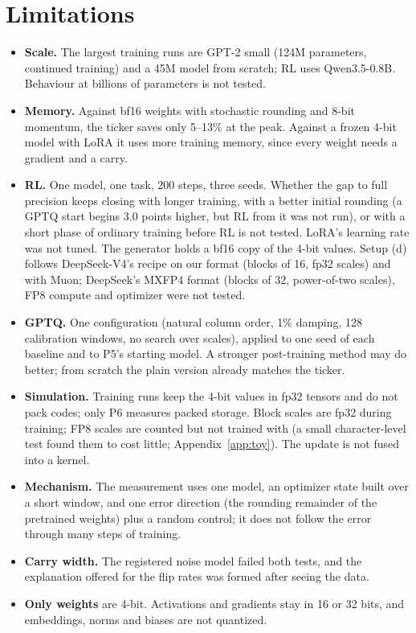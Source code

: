 \documentclass[11pt]{article}
\begin{document}
\section{Limitations}\label{sec:limitations}
\begin{itemize}
  \item \textbf{Scale.} The largest training runs are GPT-2 small (124M parameters, continued training) and a 45M
        model from scratch; RL uses Qwen3.5-0.8B. Behaviour at billions of parameters is not tested.
  \item \textbf{Memory.} Against bf16 weights with stochastic rounding and 8-bit momentum, the ticker saves only
        5--13\% at the peak. Against a frozen 4-bit model with LoRA it uses more training memory, since every weight
        needs a gradient and a carry.
  \item \textbf{RL.} One model, one task, 200 steps, three seeds. Whether the gap to full precision keeps closing with
        longer training, with a better initial rounding (a GPTQ start begins 3.0 points higher, but RL from it was not
run), or with a short phase of ordinary training before RL is not
        tested. LoRA's learning rate was not tuned. The generator holds a bf16 copy of the 4-bit values. Setup (d)
        follows DeepSeek-V4's recipe on our format (blocks of 16, fp32 scales) and with Muon; DeepSeek's MXFP4
        format (blocks of 32, power-of-two scales), FP8 compute and optimizer were not tested.
  \item \textbf{GPTQ.} One configuration (natural column order, 1\% damping, 128 calibration windows, no search over
        scales), applied to one seed of each baseline and to P5's starting model. A stronger post-training method may do better; from scratch the
        plain version already matches the ticker.
  \item \textbf{Simulation.} Training runs keep the 4-bit values in fp32 tensors and do not pack codes; only P6
        measures packed storage. Block scales are fp32 during training; FP8 scales are counted but not trained with
        (a small character-level test found them to cost little; Appendix~\ref{app:toy}). The update is not fused into
        a kernel.
  \item \textbf{Mechanism.} The measurement uses one model, an optimizer state built over a short window, and one
        error direction (the rounding remainder of the pretrained weights) plus a random control; it does not follow
        the error through many steps of training.
  \item \textbf{Carry width.} The registered noise model failed both tests, and the explanation offered for the flip
        rates was formed after seeing the data.
  \item \textbf{Only weights} are 4-bit. Activations and gradients stay in 16 or 32 bits, and embeddings, norms and
        biases are not quantized.
\end{itemize}
\end{document}

